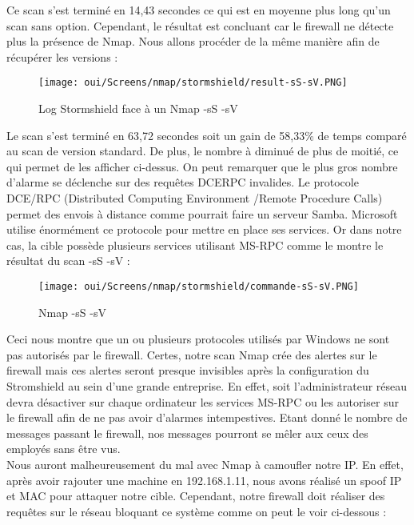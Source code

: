 Ce scan s'est terminé en 14,43 secondes ce qui est en moyenne plus long qu'un scan sans option. Cependant, le résultat est concluant car le firewall ne détecte plus la présence de Nmap. Nous allons procéder de la même manière afin de récupérer les versions :

\begin{figure}[htp!]
  \centering
  \setlength\figureheight{7cm}
  \setlength\figurewidth{9cm}
  \texttt{[image: oui/Screens/nmap/stormshield/result-sS-sV.PNG]}
  \caption{Log Stormshield face à un Nmap -sS -sV}
  \label{fig:courbe-tikz}
\end{figure}

\newpage
Le scan s'est terminé en 63,72 secondes soit un gain de 58,33\% de temps comparé au scan de version standard. De plus, le nombre à diminué de plus de moitié, ce qui permet de les afficher ci-dessus. On peut remarquer que le plus gros nombre d'alarme se déclenche sur des requêtes DCERPC invalides. Le protocole DCE/RPC (Distributed Computing Environment /Remote Procedure Calls) permet des envois à distance comme pourrait faire un serveur Samba. Microsoft utilise énormément ce protocole pour mettre en place ses services. Or dans notre cas, la cible possède plusieurs services utilisant MS-RPC comme le montre le résultat du scan -sS -sV :

\begin{figure}[htp!]
  \centering
  \setlength\figureheight{7cm}
  \setlength\figurewidth{9cm}
  \texttt{[image: oui/Screens/nmap/stormshield/commande-sS-sV.PNG]}
  \caption{Nmap -sS -sV}
  \label{fig:courbe-tikz}
\end{figure}

Ceci nous montre que un ou plusieurs protocoles utilisés par Windows ne sont pas autorisés par le firewall. Certes, notre scan Nmap crée des alertes sur le firewall mais ces alertes seront presque invisibles après la configuration du Stromshield au sein d'une grande entreprise. En effet, soit l'administrateur réseau devra désactiver sur chaque ordinateur les services MS-RPC ou les autoriser sur le firewall afin de ne pas avoir d'alarmes intempestives. Etant donné le nombre de messages passant le firewall, nos messages pourront se mêler aux ceux des employés sans être vus.\\
Nous auront malheureusement du mal avec Nmap à camoufler notre IP. En effet, après avoir rajouter une machine en 192.168.1.11, nous avons réalisé un spoof IP et MAC pour attaquer notre cible. Cependant, notre firewall doit réaliser des requêtes sur le réseau bloquant ce système comme on peut le voir ci-dessous :

